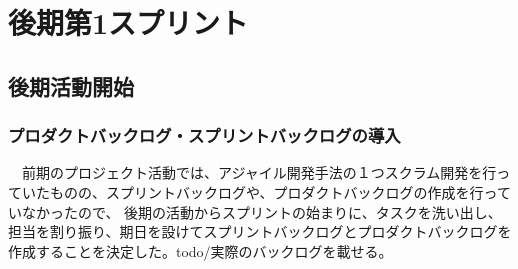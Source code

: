 \section{後期第1スプリント}
\subsection{後期活動開始}
\subsubsection{プロダクトバックログ・スプリントバックログの導入}
　前期のプロジェクト活動では、アジャイル開発手法の１つスクラム開発を行っていたものの、スプリントバックログや、プロダクトバックログの作成を行っていなかったので、
後期の活動からスプリントの始まりに、タスクを洗い出し、担当を割り振り、期日を設けてスプリントバックログとプロダクトバックログを作成することを決定した。todo/実際のバックログを載せる。

